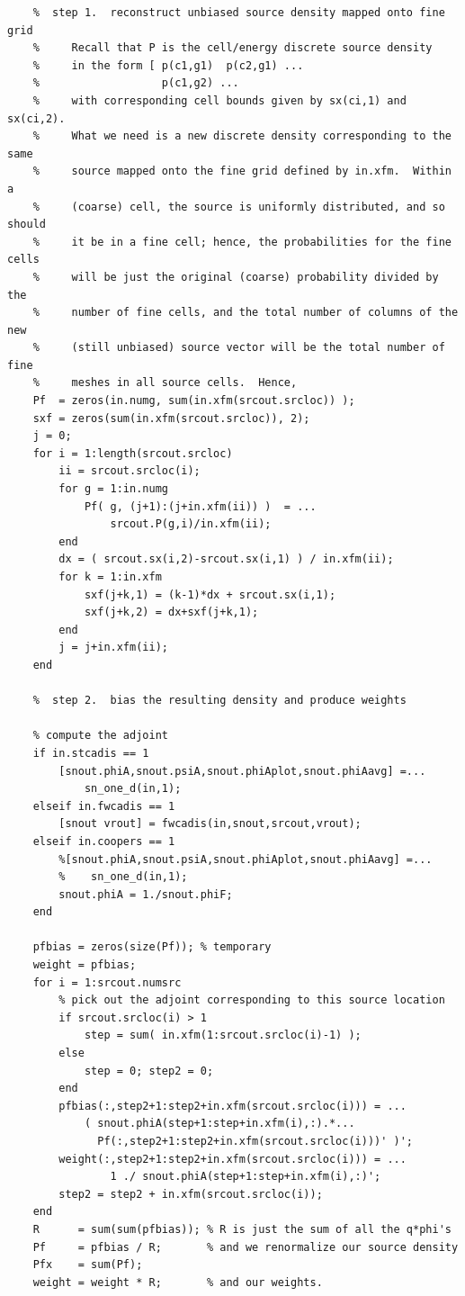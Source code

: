 \documentclass[letter,11pt]{article}
\begin{document}
{\begin{verbatim}
    %  step 1.  reconstruct unbiased source density mapped onto fine grid
    %     Recall that P is the cell/energy discrete source density
    %     in the form [ p(c1,g1)  p(c2,g1) ...
    %                   p(c1,g2) ...
    %     with corresponding cell bounds given by sx(ci,1) and sx(ci,2).
    %     What we need is a new discrete density corresponding to the same
    %     source mapped onto the fine grid defined by in.xfm.  Within a
    %     (coarse) cell, the source is uniformly distributed, and so should
    %     it be in a fine cell; hence, the probabilities for the fine cells
    %     will be just the original (coarse) probability divided by the
    %     number of fine cells, and the total number of columns of the new
    %     (still unbiased) source vector will be the total number of fine
    %     meshes in all source cells.  Hence,
    Pf  = zeros(in.numg, sum(in.xfm(srcout.srcloc)) );
    sxf = zeros(sum(in.xfm(srcout.srcloc)), 2);
    j = 0;
    for i = 1:length(srcout.srcloc)
        ii = srcout.srcloc(i);
        for g = 1:in.numg
            Pf( g, (j+1):(j+in.xfm(ii)) )  = ...
                srcout.P(g,i)/in.xfm(ii);
        end
        dx = ( srcout.sx(i,2)-srcout.sx(i,1) ) / in.xfm(ii);
        for k = 1:in.xfm
            sxf(j+k,1) = (k-1)*dx + srcout.sx(i,1);
            sxf(j+k,2) = dx+sxf(j+k,1);
        end
        j = j+in.xfm(ii);
    end
    
    %  step 2.  bias the resulting density and produce weights

    % compute the adjoint
    if in.stcadis == 1
        [snout.phiA,snout.psiA,snout.phiAplot,snout.phiAavg] =...
            sn_one_d(in,1);
    elseif in.fwcadis == 1
        [snout vrout] = fwcadis(in,snout,srcout,vrout);
    elseif in.coopers == 1
        %[snout.phiA,snout.psiA,snout.phiAplot,snout.phiAavg] =...
        %    sn_one_d(in,1);        
        snout.phiA = 1./snout.phiF;
    end
    
    pfbias = zeros(size(Pf)); % temporary
    weight = pfbias;
    for i = 1:srcout.numsrc
        % pick out the adjoint corresponding to this source location
        if srcout.srcloc(i) > 1
            step = sum( in.xfm(1:srcout.srcloc(i)-1) );
        else
            step = 0; step2 = 0;
        end
        pfbias(:,step2+1:step2+in.xfm(srcout.srcloc(i))) = ...
            ( snout.phiA(step+1:step+in.xfm(i),:).*...
              Pf(:,step2+1:step2+in.xfm(srcout.srcloc(i)))' )';
        weight(:,step2+1:step2+in.xfm(srcout.srcloc(i))) = ...
                1 ./ snout.phiA(step+1:step+in.xfm(i),:)';
        step2 = step2 + in.xfm(srcout.srcloc(i));
    end
    R      = sum(sum(pfbias)); % R is just the sum of all the q*phi's
    Pf     = pfbias / R;       % and we renormalize our source density
    Pfx    = sum(Pf);
    weight = weight * R;       % and our weights.


\end{verbatim}}
\end{document}
